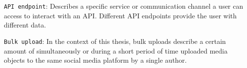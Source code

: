 \texttt{API endpoint}: Describes a specific service or communication channel a user can access to interact with an API. Different API endpoints provide the user with different data.\newline

\texttt{Bulk upload}: In the context of this thesis, bulk uploads describe a certain amount of simultaneously or during a short period of time uploaded media objects to the same social media platform by a single author.\newline




 \cleardoublepage

